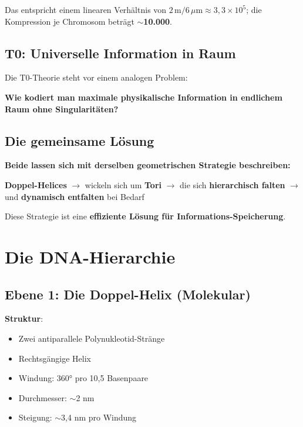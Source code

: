 	Das entspricht einem linearen Verhältnis von $2\,\text{m}/6\,\mu\text{m} \approx 3{,}3 \times 10^5$; die Kompression je Chromosom beträgt \textbf{$\sim$10.000}.

	\subsection{T0: Universelle Information in Raum}

	Die T0-Theorie steht vor einem analogen Problem:

	\begin{center}

		\textbf{Wie kodiert man maximale physikalische Information in endlichem Raum ohne Singularitäten?}
	\end{center}

	\subsection{Die gemeinsame Lösung}

	\begin{keyresult}
		\textbf{Beide lassen sich mit derselben geometrischen Strategie beschreiben:}

		\vspace{0.3cm}

		\textbf{Doppel-Helices} $\to$ wickeln sich um \textbf{Tori} $\to$ die sich \textbf{hierarchisch falten} $\to$ und \textbf{dynamisch entfalten} bei Bedarf

		\vspace{0.3cm}

		Diese Strategie ist eine \textbf{effiziente Lösung für Informations-Speicherung}.
	\end{keyresult}

	\section{Die DNA-Hierarchie}

	\subsection{Ebene 1: Die Doppel-Helix (Molekular)}

	\textbf{Struktur}:
	\begin{itemize}
		\item Zwei antiparallele Polynukleotid-Stränge
		\item Rechtsgängige Helix
		\item Windung: 360° pro 10,5 Basenpaare
		\item Durchmesser: $\sim$2 nm
		\item Steigung: $\sim$3,4 nm pro Windung
	\end{itemize}

